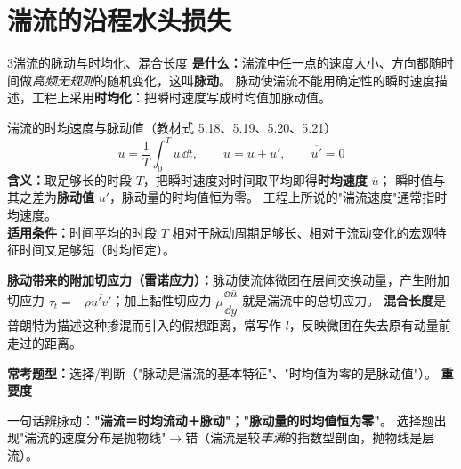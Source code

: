 \section{湍流的沿程水头损失}

\begin{kaodian}{3}{湍流的脉动与时均化、混合长度}
\textbf{是什么：}湍流中任一点的速度大小、方向都随时间做\emph{高频无规则}的随机变化，这叫\textbf{脉动}。
脉动使湍流不能用确定性的瞬时速度描述，工程上采用\textbf{时均化}：把瞬时速度写成时均值加脉动值。

\begin{gongshi}{湍流的时均速度与脉动值（教材式 5.18、5.19、5.20、5.21）}
\[ \overline{u}=\frac{1}{T}\int_0^T u\,\dd t,\qquad u=\overline{u}+u',\qquad \overline{u'}=0 \]
\textbf{含义：}取足够长的时段 $T$，把瞬时速度对时间取平均即得\textbf{时均速度} $\overline{u}$；
瞬时值与其之差为\textbf{脉动值} $u'$，脉动量的时均值恒为零。
工程上所说的"湍流速度"通常指时均速度。\\
\textbf{适用条件：}时间平均的时段 $T$ 相对于脉动周期足够长、相对于流动变化的宏观特征时间又足够短（时均恒定）。
\end{gongshi}

\textbf{脉动带来的附加切应力（雷诺应力）：}脉动使流体微团在层间交换动量，产生附加切应力
$\tau_t=-\rho\overline{u'v'}$；加上黏性切应力 $\mu\dfrac{\dd\overline{u}}{\dd y}$ 就是湍流中的总切应力。
\textbf{混合长度}是普朗特为描述这种掺混而引入的假想距离，常写作 $l$，反映微团在失去原有动量前走过的距离。

\textbf{常考题型：}选择/判断（"脉动是湍流的基本特征"、"时均值为零的是脉动值"）。
\textbf{重要度 }\quad{}\quad{}

\begin{banfa}
一句话辨脉动：\textbf{"湍流＝时均流动＋脉动"}；\textbf{"脉动量的时均值恒为零"}。
选择题出现"湍流的速度分布是抛物线"$\to$错（湍流是较\emph{丰满}的指数型剖面，抛物线是层流）。
\end{banfa}
\end{kaodian}

